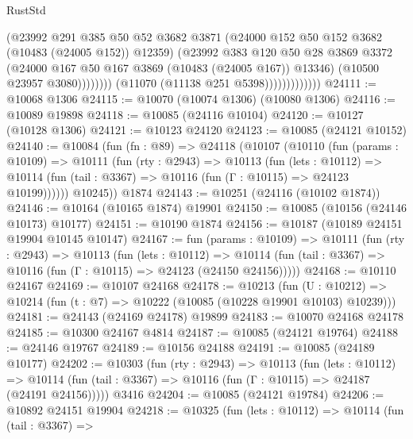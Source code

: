 \begin{lexlean}{RustStd}
\begin{coremodule}
                                    (@23992
                                      @291
                                      @385
                                      @50
                                      @52
                                      @3682
                                      @3871
                                      (@24000 @152 @50 @152 @3682 (@10483 (@24005 @152)) @12359)
                                      (@23992
                                        @383
                                        @120
                                        @50
                                        @28
                                        @3869
                                        @3372
                                        (@24000 @167 @50 @167 @3869 (@10483 (@24005 @167)) @13346)
                                        (@10500 @23957 @3080))))))))
                          (@11070 (@11138 @251 @5398)))))))))))))
@24111 := @10068 @1306
@24115 := @10070 (@10074 @1306) (@10080 @1306)
@24116 := @10089 @19898
@24118 := @10085 (@24116 @10104)
@24120 := @10127 (@10128 @1306)
@24121 := @10123 @24120
@24123 := @10085 (@24121 @10152)
@24140 := @10084
    (fun (fn : @89) =>
    @24118
      (@10107
        (@10110
          (fun (params : @10109) =>
          @10111
            (fun (rty : @2943) =>
            @10113
              (fun (lets : @10112) =>
              @10114 (fun (tail : @3367) => @10116 (fun (Γ : @10115) => @24123 @10199))))))
        @10245))
    @1874
@24143 := @10251 (@24116 (@10102 @1874))
@24146 := @10164 (@10165 @1874) @19901
@24150 := @10085 (@10156 (@24146 @10173) @10177)
@24151 := @10190 @1874
@24156 := @10187 (@10189 @24151 @19904 @10145 @10147)
@24167 := fun (params : @10109) =>
  @10111
    (fun (rty : @2943) =>
    @10113
      (fun (lets : @10112) =>
      @10114 (fun (tail : @3367) => @10116 (fun (Γ : @10115) => @24123 (@24150 @24156)))))
@24168 := @10110 @24167
@24169 := @10107 @24168
@24178 := @10213
    (fun (U : @10212) => @10214 (fun (t : @7) => @10222 (@10085 (@10228 @19901 @10103) @10239)))
@24181 := @24143 (@24169 @24178) @19899
@24183 := @10070 @24168 @24178
@24185 := @10300 @24167 @4814
@24187 := @10085 (@24121 @19764)
@24188 := @24146 @19767
@24189 := @10156 @24188
@24191 := @10085 (@24189 @10177)
@24202 := @10303
    (fun (rty : @2943) =>
    @10113
      (fun (lets : @10112) =>
      @10114 (fun (tail : @3367) => @10116 (fun (Γ : @10115) => @24187 (@24191 @24156)))))
    @3416
@24204 := @10085 (@24121 @19784)
@24206 := @10892 @24151 @19904
@24218 := @10325
    (fun (lets : @10112) =>
    @10114
      (fun (tail : @3367) =>

\end{coremodule}
\end{lexlean}
